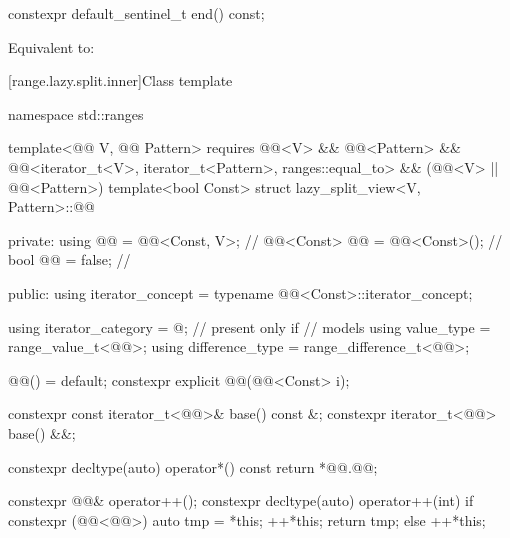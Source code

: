 %
\begin{itemdecl}
constexpr default_sentinel_t end() const;
\end{itemdecl}

\begin{itemdescr}
\pnum
\effects
Equivalent to: 
\end{itemdescr}

[range.lazy.split.inner]{Class template }

%
\begin{codeblock}
namespace std::ranges {
  template<@@ V, @@ Pattern>
    requires @@<V> && @@<Pattern> &&
             @@<iterator_t<V>, iterator_t<Pattern>, ranges::equal_to> &&
             (@@<V> || @@<Pattern>)
  template<bool Const>
  struct lazy_split_view<V, Pattern>::@@ {
  private:
    using @@ = @@<Const, V>;                     // \expos
    @@<Const> @@ = @@<Const>();     // \expos
    bool @@ = false;                              // \expos

  public:
    using iterator_concept  = typename @@<Const>::iterator_concept;

    using iterator_category = @\seebelownc@;                    // present only if 
                                                            // models 
    using value_type        = range_value_t<@@>;
    using difference_type   = range_difference_t<@@>;

    @@() = default;
    constexpr explicit @@(@@<Const> i);

    constexpr const iterator_t<@@>& base() const &;
    constexpr iterator_t<@@> base() &&;

    constexpr decltype(auto) operator*() const { return *@@.@@; }

    constexpr @@& operator++();
    constexpr decltype(auto) operator++(int) {
      if constexpr (@@<@@>) {
        auto tmp = *this;
        ++*this;
        return tmp;
      } else
        ++*this;
    }

}}
\end{codeblock}
